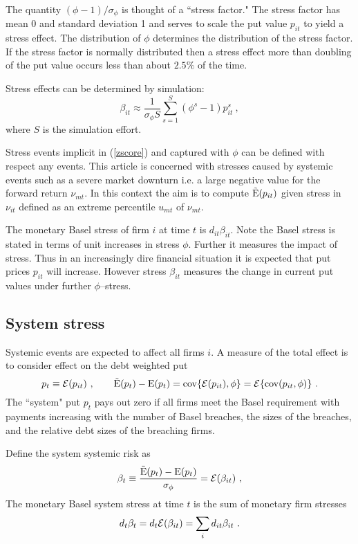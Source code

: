 \documentclass[authoryear]{elsarticle}
\newcommand{\E}{\mathrm{E}}
\newcommand{\cov}{\mathrm{cov}}
\newcommand{\Ex}{{\cal E}}
\newcommand{\eref}[1]{(\ref{#1})}
\newcommand{\cq}{\ , \qquad}
\newcommand{\be}[1]{\begin{equation}\label{#1}}
\newcommand{\ee}{\end{equation}}
\begin{document}
The quantity $(\phi-1)/\sigma_\phi$ is thought of a ``stress factor."   The stress factor has mean 0 and standard deviation 1 and serves to scale the put value $p_{it}$ to yield a stress effect.  The distribution of $\phi$ determines the distribution of the stress factor. If the stress factor is normally distributed then a stress effect more than doubling of the put value  occurs less than about $2.5\%$ of the time.   






Stress effects can be determined by simulation:
$$
\beta_{it} \approx \frac{1}{\sigma_\phi S}\sum_{s=1}^S (\phi^s-1)p_{it}^s\ ,
$$
where $S$ is the simulation effort.

 



Stress events implicit in \eref{zscore} and captured with $\phi$ can be defined with respect any events.  This article is concerned with stresses caused by systemic events such as a severe market downturn i.e. a large negative value for the forward return  $\nu_{mt}$.      In this context   the aim is to compute $\Es(p_{it})$  given stress in $\nu_{it}$ defined as an extreme   percentile $u_{mt}$ of $\nu_{mt}$.

The monetary Basel stress of firm $i$ at time $t$ is 
$
d_{it}\beta_{it}
$.   Note the Basel stress is stated in terms of unit increases in stress $\phi$.   Further it measures the impact of stress.  Thus in an increasingly dire financial situation it is expected that put prices $p_{it}$ will increase.   However stress $\beta_{it}$ measures the  change in current put values  under  further $\phi$--stress.   

\subsection{System stress}

Systemic events are expected to affect all firms $i$.   A measure of the total effect is to consider effect on  the debt weighted put
$$
p_{t}\equiv \Ex(p_{it}) \cq \Es(p_{t}) -\E(p_{t}) = \cov\{\Ex(p_{it}),\phi\}=\Ex\{\cov(p_{it},\phi)\}\ .
$$
The ``system" put $p_t$ pays out zero if all firms meet the Basel requirement with payments increasing with the number of Basel breaches, the sizes of the breaches, and the relative debt sizes of the breaching firms. 

Define the system systemic risk as
\be{ssrisk}
\beta_t \equiv \frac{\Es(p_t)-\E(p_t)}{\sigma_\phi}=\Ex(\beta_{it})\ ,
\ee
The monetary Basel system stress at time $t$ is the sum of monetary firm stresses
$$
d_t\beta_t = d_t\Ex(\beta_{it}) = \sum_i d_{it}\beta_{it}\ . 
$$
\end{document}

